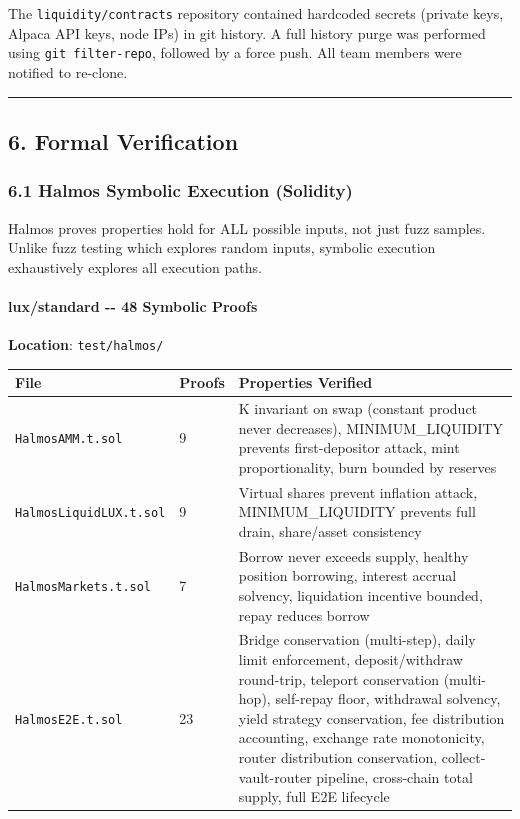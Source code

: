 \documentclass[
]{article}
\newcounter{none} %
\begin{document}
The \texttt{liquidity/contracts} repository contained hardcoded secrets
(private keys, Alpaca API keys, node IPs) in git history. A full history
purge was performed using \texttt{git\ filter-repo}, followed by a force
push. All team members were notified to re-clone.

\begin{center}\rule{0.5\linewidth}{0.5pt}\end{center}

\subsection{6. Formal Verification}\label{6-formal-verification}

\subsubsection{6.1 Halmos Symbolic Execution
(Solidity)}\label{61-halmos-symbolic-execution-solidity}

Halmos proves properties hold for ALL possible inputs, not just fuzz
samples. Unlike fuzz testing which explores random inputs, symbolic
execution exhaustively explores all execution paths.

\paragraph{lux/standard -\/- 48 Symbolic
Proofs}\label{luxstandard----48-symbolic-proofs}

\textbf{Location}: \texttt{test/halmos/}

{\def\LTcaptype{none} %
\begin{longtable}[]{@{}lll@{}}
\toprule\noalign{}
File & Proofs & Properties Verified \\
\midrule\noalign{}
\endhead
\bottomrule\noalign{}
\endlastfoot
\texttt{HalmosAMM.t.sol} & 9 & K invariant on swap (constant product
never decreases), MINIMUM\_LIQUIDITY prevents first-depositor attack,
mint proportionality, burn bounded by reserves \\
\texttt{HalmosLiquidLUX.t.sol} & 9 & Virtual shares prevent inflation
attack, MINIMUM\_LIQUIDITY prevents full drain, share/asset
consistency \\
\texttt{HalmosMarkets.t.sol} & 7 & Borrow never exceeds supply, healthy
position borrowing, interest accrual solvency, liquidation incentive
bounded, repay reduces borrow \\
\texttt{HalmosE2E.t.sol} & 23 & Bridge conservation (multi-step), daily
limit enforcement, deposit/withdraw round-trip, teleport conservation
(multi-hop), self-repay floor, withdrawal solvency, yield strategy
conservation, fee distribution accounting, exchange rate monotonicity,
router distribution conservation, collect-vault-router pipeline,
cross-chain total supply, full E2E lifecycle \\
\end{longtable}
}
\end{document}
